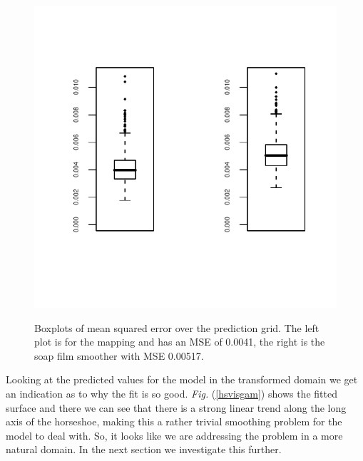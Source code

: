 \documentclass[a4paper,10pt]{amsart}
\newcommand{\Fig}[1]{\emph{Fig.} (\ref{#1})}
\begin{document}
\begin{figure}
\centering
\includegraphics[trim=0in 1in 0in 0.1in]{figs/scvssoapboxplot.pdf} \\
\caption{Boxplots of mean squared error over the prediction grid. The left plot is for the mapping and has an MSE of 0.0041, the right is the soap film smoother with MSE 0.00517.} 
\label{scvssoapboxplot}
\end{figure}

Looking at the predicted values for the model in the transformed domain we get an indication as to why the fit is so good. \Fig{hsvisgam} shows the fitted surface and there we can see that there is a strong linear trend along the long axis of the horseshoe, making this a rather trivial smoothing problem for the model to deal with. So, it looks like we are addressing the problem in a more natural domain. In the next section we investigate this further.
\end{document}
